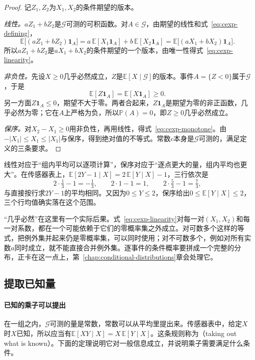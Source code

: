 \begin{proof}
记$Z_1,Z_2$为$X_1,X_2$的条件期望的版本。

\emph{线性。}$aZ_1+bZ_2$是$\mathcal{G}$可测的可积函数。对$A\in\mathcal{G}$，由期望的线性和式~\eqref{eq:cexp-defining}，
\[
 \mathbb{E}\bigl[(aZ_1+bZ_2)\mathbf{1}_{A}\bigr]
 =a\,\mathbb{E}[X_1\mathbf{1}_{A}]+b\,\mathbb{E}[X_2\mathbf{1}_{A}]
 =\mathbb{E}\bigl[(aX_1+bX_2)\mathbf{1}_{A}\bigr].
\]
所以$aZ_1+bZ_2$是$aX_1+bX_2$的条件期望的一个版本，由唯一性得式~\eqref{eq:cexp-linearity}。

\emph{非负性。}先设$X\geq0$几乎必然成立，$Z$是$\mathbb{E}[X\mid\mathcal{G}]$的版本。事件$A=\{Z<0\}$属于$\mathcal{G}$，于是
\[
 \mathbb{E}[Z\mathbf{1}_{A}]=\mathbb{E}[X\mathbf{1}_{A}]\geq0 .
\]
另一方面$Z\mathbf{1}_{A}\leq0$，期望不大于零。两者合起来，$Z\mathbf{1}_{A}$是期望为零的非正函数，几乎必然为零；它在$A$上严格为负，所以$\mathbb{P}(A)=0$，即$Z\geq0$几乎必然成立。

\emph{保序。}对$X_2-X_1\geq0$用非负性，再用线性，得式~\eqref{eq:cexp-monotone}。由$-\lvert X_1\rvert\leq X_1\leq\lvert X_1\rvert$与保序，得到绝对值的不等式。常数$c$本身是$\mathcal{G}$可测的，满足定义的三条要求。
\end{proof}

线性对应于“组内平均可以逐项计算”，保序对应于“逐点更大的量，组内平均也更大”。在传感器表上，$\mathbb{E}[2Y-1\mid X]=2\,\mathbb{E}[Y\mid X]-1$，三行依次是
\[
 2\cdot\tfrac13-1=-\tfrac13,\qquad 2\cdot1-1=1,\qquad 2\cdot\tfrac53-1=\tfrac73 ,
\]
与直接按行求$2Y-1$的平均相同。又因为$0\leq Y\leq2$，保序给出$0\leq\mathbb{E}[Y\mid X]\leq2$，三个行均值确实落在这个范围。

“几乎必然”在这里有一个实际后果。式~\eqref{eq:cexp-linearity}对每一对$(X_1,X_2)$和每一对系数，都在一个可能依赖于它们的零概率集之外成立。对可数多个这样的等式，把例外集并起来仍是零概率集，可以同时使用；对不可数多个，例如对所有实数$a$同时成立，就不能直接合并例外集。逐事件的条件概率要拼成一个完整的分布，正卡在这一点上，第~\ref{chap:conditional-distributions}章会处理它。

\subsection{提取已知量}
\label{sec:cexp-known}

\paragraph{已知的乘子可以提出}
在一组之内，$\mathcal{G}$可测的量是常数，常数可以从平均里提出来。传感器表中，给定$X$时$X$已知，所以应当有$\mathbb{E}[XY\mid X]=X\,\mathbb{E}[Y\mid X]$。这条规则称为（taking out what is known）。下面的定理说明它对一般信息成立，并说明乘子需要满足什么条件。

